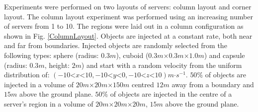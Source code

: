 Experiments were performed on two layouts of servers: column layout and corner layout. The column layout experiment was performed using an increasing number of servers from 1 to 10. The regions were laid out in a column configuration as shown in Fig. \ref{ColumnLayout}. Objects are injected at a constant rate, both near and far from boundaries. Injected objects are randomly selected from the following types: sphere (radius: $0.3m$), cuboid ($0.3m\mathord{\times}0.3m\mathord{\times}1.0m$) and capsule (radius: $0.3m$, height: $2m$) and start with a random velocity from the uniform distribution of: $(-10\mathord{<}x\mathord{<}10,-10\mathord{<}y\mathord{<}0,-10\mathord{<}z\mathord{<}10)m\mathord{\cdot}s^{-1}$. $50\%$ of objects are injected in a volume of $20m\mathord{\times}20m\mathord{\times}150m$ centred $12m$ away from a boundary and $15m$ above the ground plane. $50\%$ of objects are injected in the centre of a server's region in a volume of $20m\mathord{\times}20m\mathord{\times}20m$, $15m$ above the ground plane.

